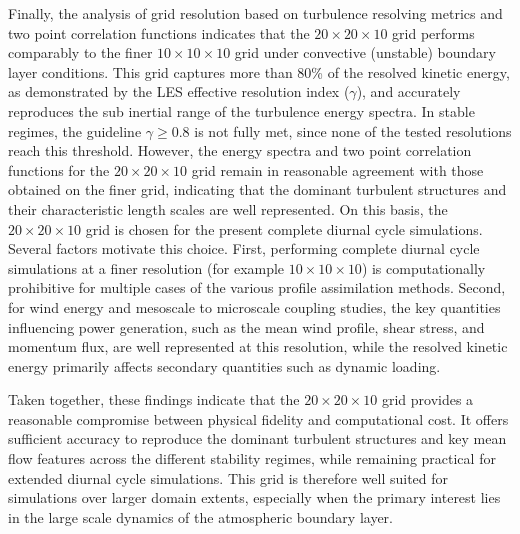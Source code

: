 Finally, the analysis of grid resolution based on turbulence resolving metrics and two point correlation functions indicates that the $20\times20\times10$ grid performs comparably to the finer $10\times10\times10$ grid under convective (unstable) boundary layer conditions. This grid captures more than 80\% of the resolved kinetic energy, as demonstrated by the LES effective resolution index ($\gamma$), and accurately reproduces the sub inertial range of the turbulence energy spectra. In stable regimes, the guideline $\gamma \ge 0.8$ is not fully met, since none of the tested resolutions reach this threshold. However, the energy spectra and two point correlation functions for the $20\times20\times10$ grid remain in reasonable agreement with those obtained on the finer grid, indicating that the dominant turbulent structures and their characteristic length scales are well represented. On this basis, the $20\times20\times10$ grid is chosen for the present complete diurnal cycle simulations. Several factors motivate this choice. First, performing complete diurnal cycle simulations at a finer resolution (for example $10\times10\times10$) is computationally prohibitive for multiple cases of the various profile assimilation methods. Second, for wind energy and mesoscale to microscale coupling studies, the key quantities influencing power generation, such as the mean wind profile, shear stress, and momentum flux, are well represented at this resolution, while the resolved kinetic energy primarily affects secondary quantities such as dynamic loading. 

Taken together, these findings indicate that the $20\times20\times10$ grid provides a reasonable compromise between physical fidelity and computational cost. It offers sufficient accuracy to reproduce the dominant turbulent structures and key mean flow features across the different stability regimes, while remaining practical for extended diurnal cycle simulations. This grid is therefore well suited for simulations over larger domain extents, especially when the primary interest lies in the large scale dynamics of the atmospheric boundary layer.

     
 


